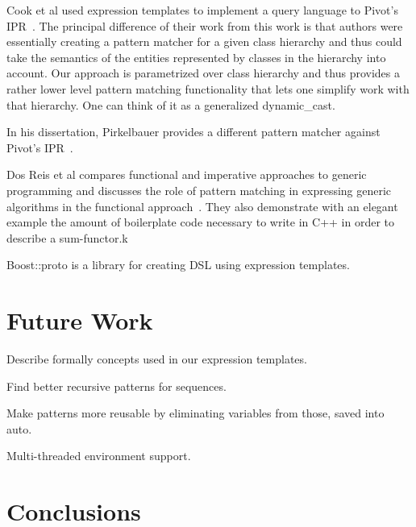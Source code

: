 \documentclass[submission,copyright]{eptcs}
\begin{document}
Cook et al used expression templates to implement a query language to Pivot's 
IPR~\cite{iql04}. The principal difference of their work from this work is that 
authors were essentially creating a pattern matcher for a given class hierarchy 
and thus could take the semantics of the entities represented by classes in the 
hierarchy into account. Our approach is parametrized over class hierarchy and 
thus provides a rather lower level pattern matching functionality that lets one 
simplify work with that hierarchy.  One can think of it as a generalized 
dynamic\_cast.

In his dissertation, Pirkelbauer provides a different pattern matcher against 
Pivot's IPR~\cite{PirkelbauerThesis}.

Dos Reis et al compares functional and imperative approaches to generic 
programming and discusses the role of pattern matching in expressing generic 
algorithms in the functional approach~\cite{dos_reis:05:what_is_gp}. They also 
demonstrate with an elegant example the amount of boilerplate code necessary to 
write in C++ in order to describe a sum-functor.k

Boost::proto is a library for creating DSL using expression templates.

\section{Future Work} %
\label{sec:fw}

Describe formally concepts used in our expression templates.

Find better recursive patterns for sequences.

Make patterns more reusable by eliminating variables from those, saved into 
auto.

Multi-threaded environment support.

\section{Conclusions} %
\label{sec:cc}
\end{document}
